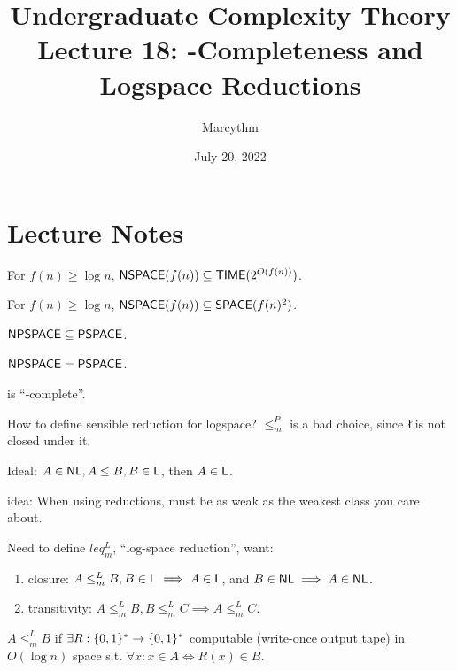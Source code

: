 \documentclass{article}
\title{Undergraduate Complexity Theory \\ Lecture 18: \NL-Completeness and Logspace Reductions}
\author{Marcythm}
\date{July 20, 2022}
\begin{document}
\maketitle{}

\section{Lecture Notes}

\begin{theorem}
  For \(f(n) \geq \log n\), \( \text{\sf NSPACE}(f(n)) \subseteq \text{\sf TIME}(2^{O(f(n))}) \).
\end{theorem}

\begin{theorem}
  For \(f(n) \geq \log n\), \( \text{\sf NSPACE}(f(n)) \subseteq \text{\sf SPACE}(f(n)^2) \).
\end{theorem}

\begin{corollary}
  \( \text{\sf NPSPACE} \subseteq \text{\sf PSPACE} \).
\end{corollary}

\begin{corollary}
  \( \text{\sf NPSPACE} = \text{\sf PSPACE} \).
\end{corollary}

\begin{claim}
   is ``\NL-complete''.
\end{claim}

How to define sensible reduction for logspace? \(\leq_m^P\) is a bad choice, since \L is not closed under it.

Ideal: \(A \in \text{\sf NL}, A \leq B, B \in \text{\sf L}\), then \(A \in \text{\sf L}\).

idea: When using reductions, must be as weak as the weakest class you care about.

Need to define \(leq_m^L\), ``log-space reduction'', want:

\begin{enumerate}
  \item closure: \(A \leq_m^L B, B \in \text{\sf L} \implies A \in \text{\sf L}\), and \(B \in \text{\sf NL} \implies A \in \text{\sf NL}\).
  \item transitivity: \(A \leq_m^L B, B \leq_m^L C \implies A \leq_m^L C\).
\end{enumerate}

\begin{definition}
  \(A \leq_m^L B\) if \(\exists R: \lbrace0, 1\rbrace^* \to \lbrace0, 1\rbrace^*\) computable (write-once output tape) in \(O(\log n)\) space s.t. \(\forall x: x \in A \iff R(x) \in B\).
\end{definition}
\end{document}
